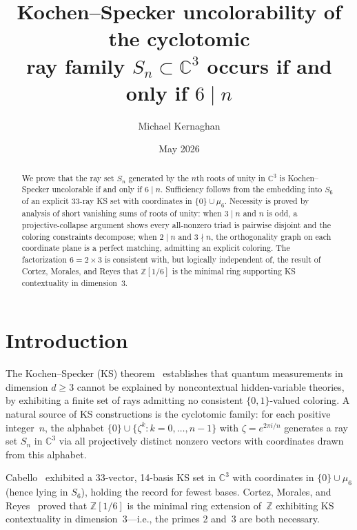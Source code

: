\documentclass[twocolumn,prl,superscriptaddress,nofootinbib]{revtex4-2}
\newcommand{\C}{\mathbb{C}}
\newcommand{\Z}{\mathbb{Z}}
\begin{document}
\title{Kochen--Specker uncolorability of the cyclotomic\\ray family $S_n \subset \C^3$ occurs if and only if $6 \mid n$}

\author{Michael Kernaghan}

\date{May 2026}

\begin{abstract}
We prove that the ray set $S_n$ generated by the $n$th roots of unity in $\C^3$ is Kochen--Specker uncolorable if and only if $6 \mid n$.  Sufficiency follows from the embedding into $S_6$ of an explicit 33-ray KS set with coordinates in $\{0\}\cup\mu_6$.  Necessity is proved by analysis of short vanishing sums of roots of unity: when $3 \mid n$ and $n$ is odd, a projective-collapse argument shows every all-nonzero triad is pairwise disjoint and the coloring constraints decompose; when $2 \mid n$ and $3 \nmid n$, the orthogonality graph on each coordinate plane is a perfect matching, admitting an explicit coloring.  The factorization $6 = 2 \times 3$ is consistent with, but logically independent of, the result of Cortez, Morales, and Reyes that $\Z[1/6]$ is the minimal ring supporting KS contextuality in dimension~3.
\end{abstract}

\maketitle

\section{Introduction}

The Kochen--Specker (KS) theorem~\cite{KochenSpecker1967} establishes that quantum measurements in dimension $d \geq 3$ cannot be explained by noncontextual hidden-variable theories, by exhibiting a finite set of rays admitting no consistent $\{0,1\}$-valued coloring.  A natural source of KS constructions is the cyclotomic family: for each positive integer~$n$, the alphabet $\{0\} \cup \{\zeta^k : k = 0, \ldots, n-1\}$ with $\zeta = e^{2\pi i/n}$ generates a ray set $S_n$ in $\C^3$ via all projectively distinct nonzero vectors with coordinates drawn from this alphabet.

Cabello~\cite{Cabello2025simplest} exhibited a 33-vector, 14-basis KS set in $\C^3$ with coordinates in $\{0\}\cup\mu_6$ (hence lying in $S_6$), holding the record for fewest bases.  Cortez, Morales, and Reyes~\cite{CortezMoralesReyes2022} proved that $\Z[1/6]$ is the minimal ring extension of~$\Z$ exhibiting KS contextuality in dimension~3---i.e., the primes 2 and~3 are both necessary.
\end{document}
